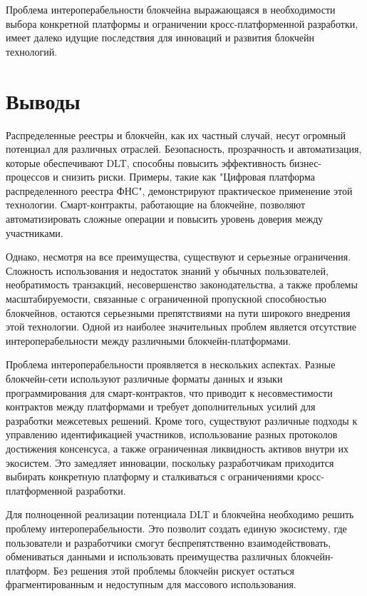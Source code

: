 Проблема интероперабельности блокчейна выражающаяся в необходимости выбора конкретной платформы и ограничении кросс-платформенной разработки, имеет далеко идущие последствия для инноваций и развития блокчейн технологий.

\section{Выводы}

Распределенные реестры и блокчейн, как их частный случай, несут огромный потенциал для различных отраслей. Безопасность, прозрачность и автоматизация, которые обеспечивают DLT, способны повысить эффективность бизнес-процессов и снизить риски. Примеры, такие как "Цифровая платформа распределенного реестра ФНС", демонстрируют практическое применение этой технологии. Смарт-контракты, работающие на блокчейне, позволяют автоматизировать сложные операции и повысить уровень доверия между участниками.

Однако, несмотря на все преимущества, существуют и серьезные ограничения. Сложность использования и недостаток знаний у обычных пользователей, необратимость транзакций, несовершенство законодательства, а также проблемы масштабируемости, связанные с ограниченной пропускной способностью блокчейнов, остаются серьезными препятствиями на пути широкого внедрения этой технологии. Одной из наиболее значительных проблем является отсутствие интероперабельности между различными блокчейн-платформами.

Проблема интероперабельности проявляется в нескольких аспектах. Разные блокчейн-сети используют различные форматы данных и языки программирования для смарт-контрактов, что приводит к несовместимости контрактов между платформами и требует дополнительных усилий для разработки межсетевых решений. Кроме того, существуют различные подходы к управлению идентификацией участников, использование разных протоколов достижения консенсуса, а также ограниченная ликвидность активов внутри их экосистем. Это замедляет инновации, поскольку разработчикам приходится выбирать конкретную платформу и сталкиваться с ограничениями кросс-платформенной разработки.

Для полноценной реализации потенциала DLT и блокчейна необходимо решить проблему интероперабельности. Это позволит создать единую экосистему, где пользователи и разработчики смогут беспрепятственно взаимодействовать, обмениваться данными и использовать преимущества различных блокчейн-платформ. Без решения этой проблемы блокчейн рискует остаться фрагментированным и недоступным для массового использования.

